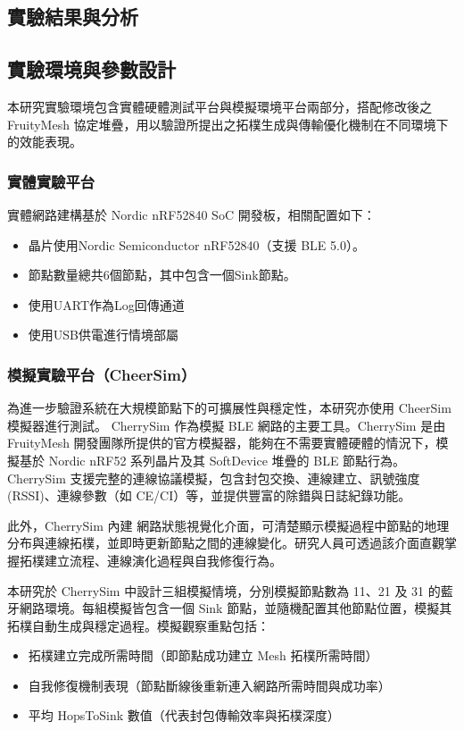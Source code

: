\begin{ZhChapter}

\chapter{實驗結果與分析}

\section{實驗環境與參數設計}

本研究實驗環境包含實體硬體測試平台與模擬環境平台兩部分，搭配修改後之 FruityMesh 協定堆疊，用以驗證所提出之拓樸生成與傳輸優化機制在不同環境下的效能表現。

\subsection{實體實驗平台}
實體網路建構基於 Nordic nRF52840 SoC 開發板，相關配置如下：
\begin{itemize}
    \item 晶片使用Nordic Semiconductor nRF52840（支援 BLE 5.0）。
    \item 節點數量總共6個節點，其中包含一個Sink節點。
    \item 使用UART作為Log回傳通道
    \item 使用USB供電進行情境部屬
\end{itemize}

\subsection{模擬實驗平台（CheerSim）}
為進一步驗證系統在大規模節點下的可擴展性與穩定性，本研究亦使用 CheerSim 模擬器進行測試。 CherrySim 作為模擬 BLE 網路的主要工具。CherrySim 是由 FruityMesh 開發團隊所提供的官方模擬器，能夠在不需要實體硬體的情況下，模擬基於 Nordic nRF52 系列晶片及其 SoftDevice 堆疊的 BLE 節點行為。CherrySim 支援完整的連線協議模擬，包含封包交換、連線建立、訊號強度 (RSSI)、連線參數（如 CE/CI）等，並提供豐富的除錯與日誌紀錄功能。

此外，CherrySim 內建 網路狀態視覺化介面，可清楚顯示模擬過程中節點的地理分布與連線拓樸，並即時更新節點之間的連線變化。研究人員可透過該介面直觀掌握拓樸建立流程、連線演化過程與自我修復行為。

本研究於 CherrySim 中設計三組模擬情境，分別模擬節點數為 11、21 及 31 的藍牙網路環境。每組模擬皆包含一個 Sink 節點，並隨機配置其他節點位置，模擬其拓樸自動生成與穩定過程。模擬觀察重點包括：
\begin{itemize}
    \item 拓樸建立完成所需時間（即節點成功建立 Mesh 拓樸所需時間）
    \item 自我修復機制表現（節點斷線後重新連入網路所需時間與成功率）
    \item 平均 HopsToSink 數值（代表封包傳輸效率與拓樸深度）
\end{itemize}


\end{ZhChapter}
